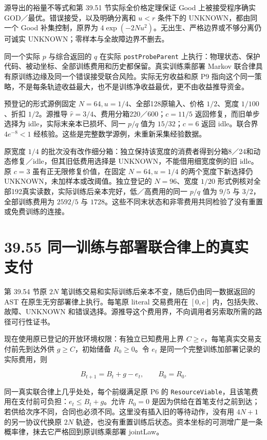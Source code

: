 \documentclass[
  11pt,
  oneside]{book}
\begin{document}
源导出的裕量不等式和第 39.51 节实际全价格定理保证 Good 上被接受程序确实 GOD／最优。错误接受，以及明确分离和 \(u<r\) 条件下的 UNKNOWN，都由同一个 Good 补集控制，原界为 \(4\exp(-2Nu^2)\)。无出生、严格边界或不够分离仍可诚实 UNKNOWN；零样本与全故障边界不删去。

同一个实际 \(p\) 与综合返回的 \(q\) 在实际 \nolinkurl{postProbeParent} 上执行：物理状态、保护代码、被动坐标、全部训练费用和历史都保留。真实训练乘部署 Markov 联合律具有原训练边缘及同一个错误接受联合风险。实际无穷收益和原 P9 指向这个同一策略，不是每条轨迹收益最大，也不是训练净收益最优，更不由收益推导资金。

预登记的形式源例固定 \(N=64,u=1/4\)、全部128原输入、价格 \(1/2\)、宽度 \(1/100\)、折扣 \(1/2\)。源推导 \(\widehat r=3/4\)、费用分箱220／600；\(c=11/5\) 返回修复，而旧单步选择为 idle，实际末亲本已损坏、同一 \(p/q\) 值为 \(15/32\)；\(c=6\) 返回 idle。联合界 \(4e^{-8}<1\) 经核验。这些是完整数学源例，未重新采集经验数据。

原宽度 \(1/4\) 的批次没有改作细分箱：独立保持该宽度的消费者得到分箱8／24和动态修复／idle，但其旧低费用选择是 UNKNOWN，不能借用细宽度例的旧 idle。原 \(c=3\) 虽有正无限修复价值，在固定 \(N=64,u=1/4\) 的两个宽度下新选择仍 UNKNOWN，未加样本或改阈值。独立登记的 \(N=96\)、宽度 \(1/20\) 形式例核对全部192真实读数，实际训练后亲本完好，低／高费用的同一 \(p/q\) 值为 \(9/5\) 与 \(3/2\)，全部训练费用为 \(2592/5\) 与 \(1728\)。这些不同末状态和非零费用共同检验了没有重置或免费训练的连接。

\section{39.55 同一训练与部署联合律上的真实支付}\label{ux540cux4e00ux8badux7ec3ux4e0eux90e8ux7f72ux8054ux5408ux5f8bux4e0aux7684ux771fux5b9eux652fux4ed8}

第 39.54 节原 \(2N\) 笔训练交易和实际训练后亲本不变，随后仍由同一数据返回的 AST 在原生无穷部署律上执行。每笔原 literal 交易费用在 \([0,c]\) 内，包括失败、故障、UNKNOWN 和错误选择。源推导这个费用界，不向调用者另索取所需的路径可行性证书。

现在使用原已登记的开放环境权限：有独立已知费用上界 \(C\ge c\)，每笔真实交易支付前先到达外供 \(g\ge C\)，初始储备 \(R_0\ge0\)。令 \(e_t\) 是同一个完整训练加部署记录的实际费用，则

\[B_{t+1}=B_t+g-e_t,\qquad B_0=R_0.\]

同一真实联合律上几乎处处，每个前缀满足原 P6 的 \nolinkurl{ResourceViable}，且该笔费用在支付前可负担：\(e_t\le B_t+g\)。允许 \(R_0=0\) 是因为供给在首笔支付之前到达；若供给次序不同，合同也必须不同。这里没有插入旧的等待动作，没有用 \(4N+1\) 的另一协议代换原 \(2N\) 轨迹，也没有重置训练后状态。资本坐标的可测增广是一条概率律，抹去它严格回到原训练乘部署 jointLaw。
\end{document}
